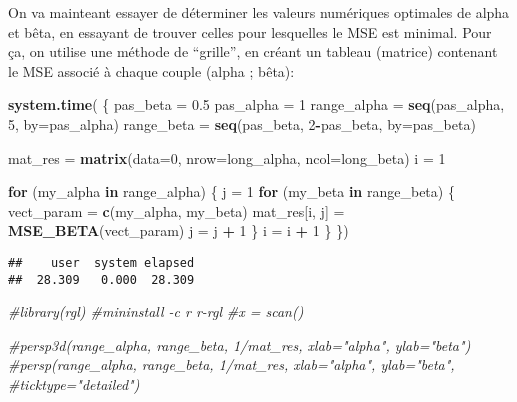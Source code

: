 \documentclass[]{article}
\newenvironment{Shaded}{\begin{snugshade}}{\end{snugshade}}
\newcommand{\CommentTok}[1]{\textcolor[rgb]{0.56,0.35,0.01}{\textit{#1}}}
\newcommand{\ControlFlowTok}[1]{\textcolor[rgb]{0.13,0.29,0.53}{\textbf{#1}}}
\newcommand{\DataTypeTok}[1]{\textcolor[rgb]{0.13,0.29,0.53}{#1}}
\newcommand{\DecValTok}[1]{\textcolor[rgb]{0.00,0.00,0.81}{#1}}
\newcommand{\FloatTok}[1]{\textcolor[rgb]{0.00,0.00,0.81}{#1}}
\newcommand{\KeywordTok}[1]{\textcolor[rgb]{0.13,0.29,0.53}{\textbf{#1}}}
\newcommand{\NormalTok}[1]{#1}
\newcommand{\OperatorTok}[1]{\textcolor[rgb]{0.81,0.36,0.00}{\textbf{#1}}}
\newcommand{\StringTok}[1]{\textcolor[rgb]{0.31,0.60,0.02}{#1}}
\begin{document}
On va mainteant essayer de déterminer les valeurs numériques optimales
de alpha et bêta, en essayant de trouver celles pour lesquelles le MSE
est minimal. Pour ça, on utilise une méthode de ``grille'', en créant un
tableau (matrice) contenant le MSE associé à chaque couple (alpha ;
bêta):

\begin{Shaded}
\begin{Highlighting}[]
\KeywordTok{system.time}\NormalTok{(}
\NormalTok{\{  }
\NormalTok{  pas_beta =}\StringTok{ }\FloatTok{0.5}
\NormalTok{  pas_alpha =}\StringTok{ }\DecValTok{1}
\NormalTok{  range_alpha =}\StringTok{ }\KeywordTok{seq}\NormalTok{(pas_alpha, }\DecValTok{5}\NormalTok{, }\DataTypeTok{by=}\NormalTok{pas_alpha)}
\NormalTok{  range_beta =}\StringTok{ }\KeywordTok{seq}\NormalTok{(pas_beta, }\DecValTok{2}\OperatorTok{-}\NormalTok{pas_beta, }\DataTypeTok{by=}\NormalTok{pas_beta)}
  
\NormalTok{  mat_res =}\StringTok{ }\KeywordTok{matrix}\NormalTok{(}\DataTypeTok{data=}\DecValTok{0}\NormalTok{, }\DataTypeTok{nrow=}\NormalTok{long_alpha, }\DataTypeTok{ncol=}\NormalTok{long_beta)}
\NormalTok{  i =}\StringTok{ }\DecValTok{1}
  
  \ControlFlowTok{for}\NormalTok{ (my_alpha }\ControlFlowTok{in}\NormalTok{ range_alpha)}
\NormalTok{  \{}
\NormalTok{    j =}\StringTok{ }\DecValTok{1}
    \ControlFlowTok{for}\NormalTok{ (my_beta }\ControlFlowTok{in}\NormalTok{ range_beta)}
\NormalTok{    \{}
\NormalTok{      vect_param =}\StringTok{ }\KeywordTok{c}\NormalTok{(my_alpha, my_beta)}
\NormalTok{      mat_res[i, j] =}\StringTok{ }\KeywordTok{MSE_BETA}\NormalTok{(vect_param)}
\NormalTok{      j =}\StringTok{ }\NormalTok{j }\OperatorTok{+}\StringTok{ }\DecValTok{1}
\NormalTok{    \}}
\NormalTok{    i =}\StringTok{ }\NormalTok{i }\OperatorTok{+}\StringTok{ }\DecValTok{1}
\NormalTok{  \}}
\NormalTok{\})}
\end{Highlighting}
\end{Shaded}

\begin{verbatim}
##    user  system elapsed 
##  28.309   0.000  28.309
\end{verbatim}

\begin{Shaded}
\begin{Highlighting}[]
\CommentTok{#library(rgl) #mininstall -c r r-rgl}
\CommentTok{#x = scan()}

\CommentTok{#persp3d(range_alpha, range_beta, 1/mat_res, xlab="alpha", ylab="beta")}
\CommentTok{#persp(range_alpha, range_beta, 1/mat_res,  xlab="alpha", ylab="beta",}
      \CommentTok{#ticktype="detailed")}
\end{Highlighting}
\end{Shaded}
\end{document}
